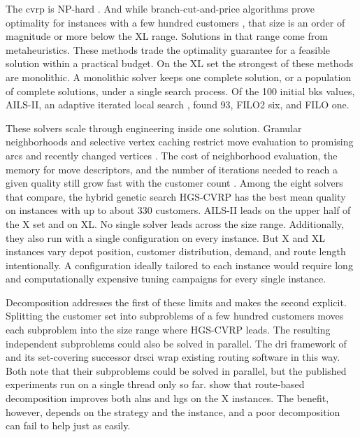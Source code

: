The \gls{cvrp} is NP-hard \citep{lenstraComplexityVehicleRouting1981}. And while branch-cut-and-price algorithms prove optimality for instances with a few hundred customers \citep{improved_pecin_2017,generic_pessoa_2020}, that size is an order of magnitude or more below the XL range. Solutions in that range come from metaheuristics. These methods trade the optimality guarantee for a feasible solution within a practical budget.
On the XL set the strongest of these methods are monolithic. A monolithic solver keeps one complete solution, or a population of complete solutions, under a single search process.
Of the 100 initial \gls{bks} values, AILS-II, an adaptive iterated local search \citep{maximoAILSIIAdaptiveIterated2024}, found 93, FILO2 \citep{accorsiRoutingOneMillion2024} six, and FILO \citep{accorsiFastScalableHeuristic2021} one.

These solvers scale through engineering inside one solution. Granular neighborhoods and selective vertex caching restrict move evaluation to promising arcs and recently changed vertices \citep{accorsiFastScalableHeuristic2021,tothGranularTabuSearch2003}.
The cost of neighborhood evaluation, the memory for move descriptors, and the number of iterations needed to reach a given quality still grow fast with the customer count \citep{accorsiFastScalableHeuristic2021,efficiently_arnold_2019}.
Among the eight solvers that \citet{queirogaXLInstancesCapacitated2026} compare, the hybrid genetic search HGS-CVRP \citep{vidalHybridGeneticSearchCVRP2022} has the best mean quality on instances with up to about 330 customers. AILS-II leads on the upper half of the X set and on XL\@. No single solver leads across the size range. Additionally, they also run with a single configuration on every instance. But X and XL instances vary depot position, customer distribution, demand, and route length intentionally. A configuration ideally tailored to each instance would require long and computationally expensive tuning campaigns for every single instance.

Decomposition addresses the first of these limits and makes the second explicit.
Splitting the customer set into subproblems of a few hundred customers moves each subproblem into the size range where HGS-CVRP leads. The resulting independent subproblems could also be solved in parallel.
The \gls{dri} framework of \citet{kerscherDecomposerouteimproveFrameworkSolving2025} and its set-covering successor \gls{drsci} \citep{kerscherSolvingHeterogeneousVehicle} wrap existing routing software in this way.
Both note that their subproblems could be solved in parallel, but the published experiments run on a single thread only so far.
\citet{santiniDecompositionStrategiesVehicle2023} show that route-based decomposition improves both \gls{alns} and \gls{hgs} on the X instances. The benefit, however, depends on the strategy and the instance, and a poor decomposition can fail to help just as easily.

